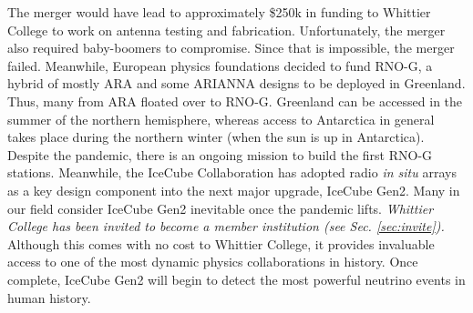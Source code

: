 \documentclass[../../../main.tex]{subfiles}
\begin{document}
The merger would have lead to approximately \$250k in funding to Whittier College to work on antenna testing and fabrication.  Unfortunately, the merger also required baby-boomers to compromise.  Since that is impossible, the merger failed.  Meanwhile, European physics foundations decided to fund RNO-G, a hybrid of mostly ARA and some ARIANNA designs to be deployed in Greenland.  Thus, many from ARA floated over to RNO-G.  Greenland can be accessed in the summer of the northern hemisphere, whereas access to Antarctica in general takes place during the northern winter (when the sun is up in Antarctica).  Despite the pandemic, there is an ongoing mission to build the first RNO-G stations.  Meanwhile, the IceCube Collaboration has adopted radio \textit{in situ} arrays as a key design component into the next major upgrade, IceCube Gen2.  Many in our field consider IceCube Gen2 inevitable once the pandemic lifts.  \textit{Whittier College has been invited to become a member institution (see Sec. \ref{sec:invite}).}  Although this comes with no cost to Whittier College, it provides invaluable access to one of the most dynamic physics collaborations in history.  Once complete, IceCube Gen2 will begin to detect the most powerful neutrino events in human history.
\end{document}
